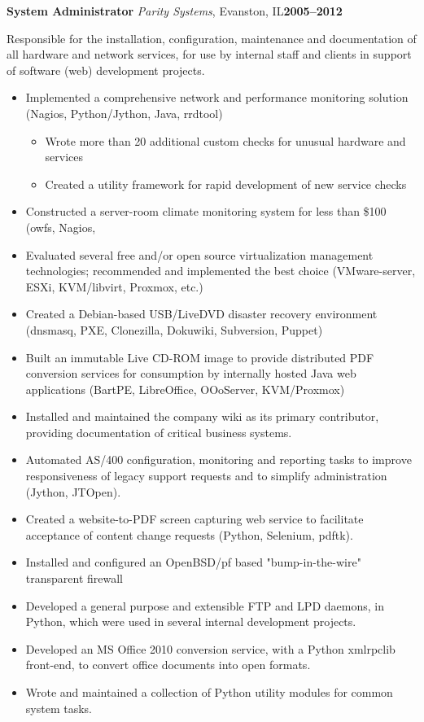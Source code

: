\documentclass[11pt,letterpaper]{article}
\newcommand{\cventry}[5]{%
{\bfseries{#2}} {\small{\textit{#3}, #4}}\hfill {\small\bfseries{#1}}
\begin{adjustwidth}{1em}{2em}{\raggedright{#5}}\end{adjustwidth}
}
\begin{document}
\cventry{2005--2012}{System Administrator}{Parity Systems}{Evanston, IL}{%
{Responsible for the installation, configuration, maintenance and documentation
of all hardware and network services, for use by internal staff and clients
in support of software (web) development projects.}

\begin{small}
\begin{itemize}
\item Implemented a comprehensive network and performance monitoring solution
      (Nagios, Python/Jython, Java, rrdtool)
      \begin{itemize}
      \item Wrote more than 20 additional custom checks for unusual hardware
            and services
      \item Created a utility framework for rapid development of new service
            checks
      \end{itemize}
\item Constructed a server-room climate monitoring system for less than \$100
      (owfs, Nagios,
\item Evaluated several free and/or open source virtualization management
      technologies; recommended and implemented the best choice (VMware-server,
      ESXi, KVM/libvirt, Proxmox, etc.)
\item Created a Debian-based USB/LiveDVD disaster recovery environment (dnsmasq,
      PXE, Clonezilla, Dokuwiki, Subversion, Puppet)
\item Built an immutable Live CD-ROM image to provide distributed
      PDF conversion services for consumption by internally hosted Java web
      applications (BartPE, LibreOffice, OOoServer, KVM/Proxmox)
\item Installed and maintained the company wiki as its primary contributor,
      providing documentation of critical business systems.
\item Automated AS/400 configuration, monitoring and reporting tasks to
      improve responsiveness of legacy support requests and to simplify
      administration (Jython, JTOpen).
\item Created a website-to-PDF screen capturing web service
      to facilitate acceptance of content change requests (Python, Selenium,
      pdftk).
\item Installed and configured an OpenBSD/pf based "bump-in-the-wire"
      transparent firewall
\item Developed a general purpose and extensible FTP and LPD daemons, in Python,
       which were used in several internal development projects.
\item Developed an MS Office 2010 conversion service, with a Python xmlrpclib
      front-end, to convert office documents into open formats.
\item Wrote and maintained a collection of Python utility modules for common
      system tasks.
\end{itemize}
\end{small}
}
\end{document}
